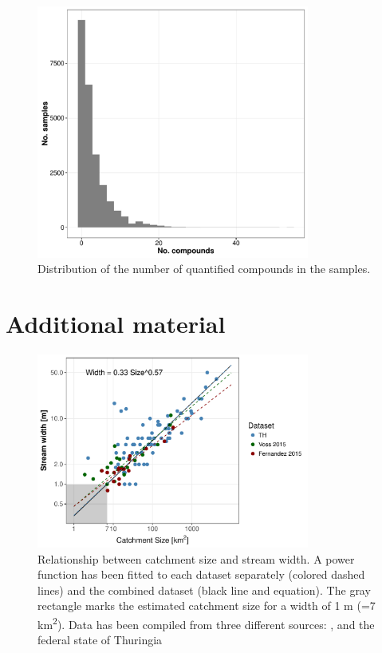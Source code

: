 \documentclass[pdftex,
	a4paper,
	titlepage=false]{scrreprt}
\begin{document}
\begin{figure}[ht]
	\centering
	\includegraphics[width = 0.8\textwidth]{pmix}
	\caption{Distribution of the number of quantified compounds in the samples.}
	\label{fig:pmix}
\end{figure}


\chapter{Additional material}

\begin{figure}[ht]
	\centering
	\includegraphics[width = 0.8\textwidth]{width_size}
	\caption[Relationship between catchment size and stream width.]{Relationship between catchment size and stream width. A power function has been fitted to each dataset separately (colored dashed lines) and the combined dataset (black line and equation). The gray rectangle marks the estimated catchment size for a width of 1 m (=7 km\textsuperscript{2}). Data has been compiled from three different sources: \citet{Fern2015}, \citet{Voss2015} and the federal state of Thuringia}
	\label{fig:size_width}
\end{figure}



\end{document}
